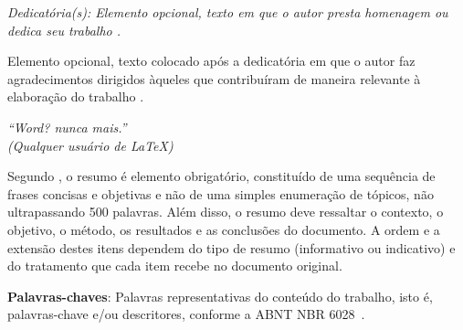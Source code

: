 \documentclass[
	12pt,				    %
	openright,			    %
	oneside,			    %
	a4paper,			    %
    sumario=tradicional,    %
	english,			    %
	brazil,				    %
	]{abntex2}
\let\cite\parencite
\begin{document}
\frenchspacing

\pretextual
\imprimircapa

\imprimirfolhaderosto

\imprimirfolhadeaprovacao

\begin{dedicatoria}
   \vspace*{\fill}
   \centering
   \noindent
   \textit{Dedicat\'oria(s): Elemento opcional, texto em que o autor presta homenagem ou dedica seu trabalho \cite{NBR14724:2011}.}
   \vspace*{\fill}
\end{dedicatoria}

\begin{agradecimentos}
Elemento opcional, texto colocado ap\'os a dedicat\'oria em que o autor faz agradecimentos dirigidos àqueles que contribuíram de maneira relevante à elaboração do trabalho \cite{NBR14724:2011}. 
\end{agradecimentos}

\begin{epigrafe}
    \vspace*{\fill}
	\begin{flushright}
		\textit{``Word? nunca mais.''\\
		(Qualquer usuário de \LaTeX)}
	\end{flushright}
\end{epigrafe}

\begin{resumo}
 \noindent
Segundo \cite{NBR6028:2003}, o resumo é elemento obrigat\'orio, constitu\'ido de uma sequ\^encia de frases concisas e objetivas e n\~ao de uma simples enumera\c c\~ao de t\'opicos, não ultrapassando 500 palavras. Além disso, o resumo deve ressaltar o contexto, o objetivo, o método, os resultados e as conclusões do documento. A ordem e a extensão destes itens dependem do tipo de resumo (informativo ou indicativo) e do tratamento que cada item recebe no documento original. 
 \vspace{\onelineskip}

 \noindent
 \textbf{Palavras-chaves}: Palavras representativas do conteúdo do trabalho, isto é, palavras-chave e/ou descritores, conforme a ABNT NBR 6028~\cite{NBR6028:2003}.
\end{resumo}
\end{document}
